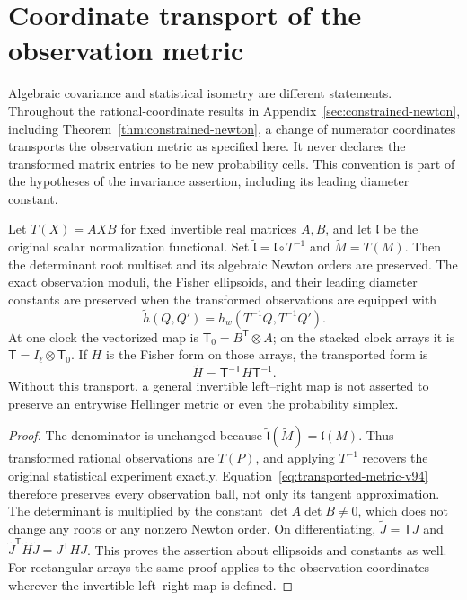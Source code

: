 \section{Coordinate transport of the observation metric}
\label{sec:metric-transport-v94}
Algebraic covariance and statistical isometry are different statements.
Throughout the rational-coordinate results in Appendix~\ref{sec:constrained-newton},
including Theorem~\ref{thm:constrained-newton}, a change of numerator
coordinates transports the observation metric as specified here.
It never declares the transformed matrix entries to be new probability
cells. This convention is part of the hypotheses of the invariance
assertion, including its leading diameter constant.

\begin{proposition}
\label{prop:metric-transport-v94}
Let $T(X)=AXB$ for fixed invertible real matrices $A,B$, and let
$\mathfrak l$ be the original scalar normalization functional. Set
$\widetilde{\mathfrak l}=\mathfrak l\circ T^{-1}$ and
$\widetilde M=T(M)$. Then the determinant root multiset and its
algebraic Newton orders are preserved. The exact observation moduli,
the Fisher ellipsoids, and their leading diameter constants are
preserved when the transformed observations are equipped with
\begin{equation}\label{eq:transported-metric-v94}
 \widetilde h(Q,Q')=h_w(T^{-1}Q,T^{-1}Q').
\end{equation}
At one clock the vectorized map is $\mathsf T_0=B^{\mathsf T}\otimes A$;
on the stacked clock arrays it is $\mathsf T=I_\ell\otimes\mathsf T_0$.
If $H$ is the Fisher form on those arrays, the transported form is
\[
 \widetilde H=\mathsf T^{-\mathsf T}H\mathsf T^{-1}.
\]
Without this transport, a general invertible left--right map is not
asserted to preserve an entrywise Hellinger metric or even the
probability simplex.
\end{proposition}
\begin{proof}
The denominator is unchanged because
$\widetilde{\mathfrak l}(\widetilde M)=\mathfrak l(M)$. Thus transformed rational
observations are $T(P)$, and applying $T^{-1}$ recovers the original
statistical experiment exactly. Equation~\eqref{eq:transported-metric-v94}
therefore preserves every observation ball, not only its tangent
approximation. The determinant is multiplied by the constant
$\det A\det B\ne0$, which does not change any roots or any
nonzero Newton order. On differentiating, $\widetilde J=\mathsf TJ$
and
$\widetilde J^{\mathsf T}\widetilde H\widetilde J=J^{\mathsf T}HJ$.
This proves the assertion about ellipsoids and constants as well.
For rectangular arrays the same proof applies to the observation
coordinates wherever the invertible left--right map is defined.
\end{proof}

